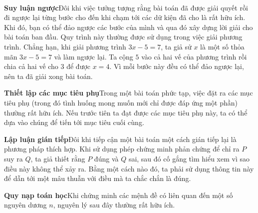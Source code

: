 \thispagestyle{empty}

\noindent
\begin{minipage}[t]{0.26\textwidth}
    ~
\end{minipage}%
\hfill
\begin{minipage}[t]{0.71\textwidth}
    \noindent\textbf{\textsf{\color{stewartcyan}Suy luận ngược}}\quad Đôi khi việc tưởng tượng rằng bài toán đã được giải quyết rồi đi ngược lại từng bước cho đến khi chạm tới các dữ kiện đã cho là rất hữu ích. Khi đó, bạn có thể đảo ngược các bước của mình và qua đó xây dựng lời giải cho bài toán ban đầu. Quy trình này thường được sử dụng trong việc giải phương trình. Chẳng hạn, khi giải phương trình $3x - 5 = 7$, ta giả sử $x$ là một số thỏa mãn $3x - 5 = 7$ và làm ngược lại. Ta cộng $5$ vào cả hai vế của phương trình rồi chia cả hai vế cho $3$ để được $x = 4$. Vì mỗi bước này đều có thể đảo ngược lại, nên ta đã giải xong bài toán.

    \vspace{0.25cm}
    \noindent\textbf{\textsf{\color{stewartcyan}Thiết lập các mục tiêu phụ}}\quad Trong một bài toán phức tạp, việc đặt ra các mục tiêu phụ (trong đó tình huống mong muốn mới chỉ được đáp ứng một phần) thường rất hữu ích. Nếu trước tiên ta đạt được các mục tiêu phụ này, ta có thể dựa vào chúng để tiến tới mục tiêu cuối cùng.

    \vspace{0.25cm}
    \noindent\textbf{\textsf{\color{stewartcyan}Lập luận gián tiếp}}\quad Đôi khi tiếp cận một bài toán một cách gián tiếp lại là phương pháp thích hợp. Khi sử dụng phép chứng minh phản chứng để chỉ ra $P$ suy ra $Q$, ta giả thiết rằng $P$ đúng và $Q$ sai, sau đó cố gắng tìm hiểu xem vì sao điều này không thể xảy ra. Bằng một cách nào đó, ta phải sử dụng thông tin này để dẫn tới một mâu thuẫn với điều mà ta chắc chắn là đúng.

    \vspace{0.25cm}
    \noindent\textbf{\textsf{\color{stewartcyan}Quy nạp toán học}}\quad Khi chứng minh các mệnh đề có liên quan đến một số nguyên dương $n$, nguyên lý sau đây thường rất hữu ích.


\end{minipage}
